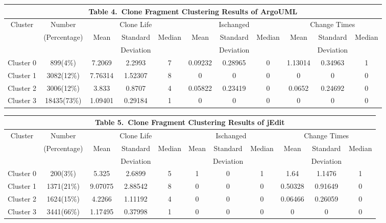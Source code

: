 {
\begin{table}[!htb]
\tabcolsep=2.5pt 
\scriptsize
\begin{center}
\begin{tabular}{|c|c|c|c|c|c|c|c|c|c|c|}
\multicolumn{11}{c}{\bf Table 4.\ Clone Fragment Clustering Results of ArgoUML}\\ \hline
\multirow{3}{*}{Cluster}&{Number}&\multicolumn{3}{c}{Clone Life}\vline&\multicolumn{3}{c}{Ischanged}\vline&\multicolumn{3}{c}{Change Times} \vline\\
\cline{3-11}
&(Percentage)&\multirow{2}{*}{Mean}& Standard &\multirow{2}{*}{Median}&\multirow{2}{*}{Mean}&Standard &\multirow{2}{*}{Median}&\multirow{2}{*}{Mean}&Standard &\multirow{2}{*}{Median}\\
&&&  Deviation&&& Deviation&&& Deviation&\\ \hline
Cluster 0&899(4\%)&7.2069&2.2993&7&0.09232&0.28965&0&1.13014&0.34963&1\\ \hline
Cluster 1&3082(12\%)&7.76314&1.52307&8&0&0&0	&0&0&0\\ \hline
Cluster 2&3006(12\%)&3.833&0.8707&4&0.05822&0.23419	&0	&0.0652&0.24692&0\\ \hline
Cluster 3&18435(73\%)&1.09401&0.29184	&1	&0	&0	&0	&0	&0	&0\\ \hline
\end{tabular}
\end{center}
\end{table}
}
{
\begin{table}[!htb]
\tabcolsep=2.5pt 
\scriptsize
\begin{center}
\begin{tabular}{|c|c|c|c|c|c|c|c|c|c|c|}
\multicolumn{11}{c}{\bf Table 5.\ Clone Fragment Clustering Results of jEdit}\\ 
\hline
\multirow{3}{*}{Cluster}&{Number}&\multicolumn{3}{c}{Clone Life}\vline&\multicolumn{3}{c}{Ischanged}\vline&\multicolumn{3}{c}{Change Times} \vline\\
\cline{3-11}
&(Percentage)&\multirow{2}{*}{Mean}& Standard &\multirow{2}{*}{Median}&\multirow{2}{*}{Mean}&Standard &\multirow{2}{*}{Median}&\multirow{2}{*}{Mean}&Standard &\multirow{2}{*}{Median}\\
&&&  Deviation&&& Deviation&&& Deviation&\\ \hline
Cluster 0&	200(3\%)	&5.325	&2.6899	&5	&1	&0	&1	&1.64	&1.1476	&1\\ \hline
Cluster 1&	1371(21\%)	&9.07075	&2.88542	&8	&0	&0	&0	&0.50328	&0.91649	&0\\ \hline
Cluster 2&	1624(15\%)	&4.2266	&1.11192	&4	&0	&0	&0	&0.06466	&0.26059	&0\\ \hline
Cluster 3&	3441(66\%)	&1.17495	&0.37998	&1	&0	&0	&0	&0	&0	&0\\ \hline
\end{tabular}
\end{center}
\end{table}
}

